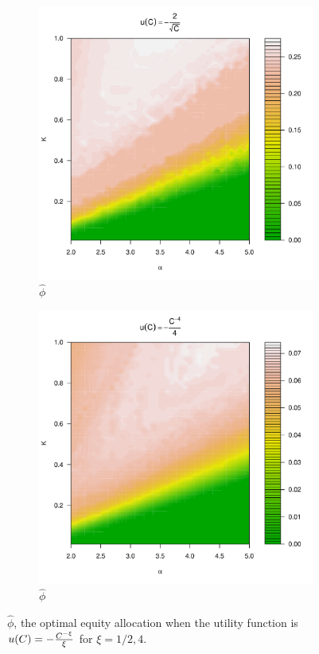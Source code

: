 \documentclass{article}
\newcommand{\1}[1]{
  \mathbf{1}_{\{#1\}}
}
\begin{document}
\begin{figure}
  \begin{subfigure}[b]{0.5\linewidth}
    \includegraphics[width=\textwidth]{phi_hat_pareto5e-1.pdf}
    \caption{$\hat\phi$}
    \label{fig:phi_hat_pareto5e-1}
  \end{subfigure}
  \begin{subfigure}[b]{0.5\linewidth}
    \includegraphics[width=\textwidth]{phi_hat_pareto4.pdf}
    \caption{$\hat\phi$}
    \label{fig:phi_hat_pareto4}
  \end{subfigure}
  \caption{$\hat\phi$, the optimal equity allocation when the utility
    function is $u(C) = -{C^{-\xi} \over \xi}$ for $\xi = 1/2, 4$.
  }
\end{figure}
\end{document}

